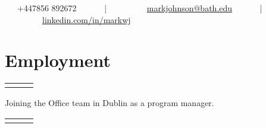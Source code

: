 \documentclass[a4paper]{deedy-resume}
\begin{document}
\thispagestyle{empty}
\pagestyle{empty}


\vspace*{1mm}
\vspace{3mm}

\faPhone \ \ \ +447856 892672 \ \ \ \ \ \ | \ \ \ \ \ \  
\faEnvelope \ \ \ \href{mailto:markjohnson@bath.edu}{markjohnson@bath.edu} \ \ \ \ \ \ | \ \ \ \ \ \   
\faLinkedin \ \ \ \href{https://www.linkedin.com/in/markwj}{linkedin.com/in/markwj} \\ [1\baselineskip]

\iffalse
\vspace{0mm}
\center{Technically focused individual with a track record of taking responsibility and delivering innovative products. Graduating summer 2017}
\vspace{1mm}
\fi

\section{Employment}

\normalfont
{}
\vspace{2 mm}

\noindent\begin{tabularx}{\textwidth}{@{}YQZ@{}}
 &  & 
\end{tabularx}
\vspace{-2mm}
\begin{tightitemize}
	\item Joining the Office team in Dublin as a program manager.
\end{tightitemize}
\sectionspace

\noindent\begin{tabularx}{\textwidth}{@{}YQZ@{}}
 &  & 
\end{tabularx}
\vspace{-2mm}
\end{document}
